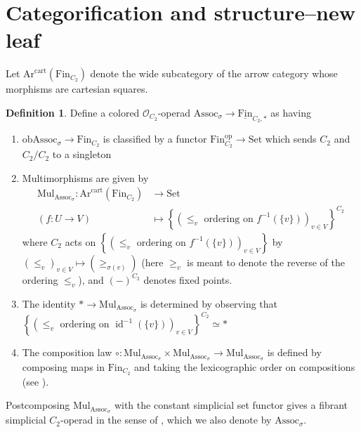 \documentclass{article}
\DeclareMathOperator{\id}{id} %
\newcommand{\op}{\mathrm{op}}
\newcommand{\Assoc}{\mathrm{Assoc}}
\newcommand{\Fin}{\mathrm{Fin}} %
\newcommand{\Ar}{\mathrm{Ar}}
\theoremstyle{definition}
\newtheorem{definition}[equation]{Definition}
\begin{document}
\section{Categorification and structure--new leaf}
Let $ \Ar^{\mathrm{cart}}\left(\Fin_{C_2}\right) $ denote the wide subcategory of the arrow category whose morphisms are cartesian squares. 
\begin{definition}%
    Define a colored $ \mathcal{O}_{C_2} $-operad $ \mathbf{\Assoc}_{\sigma} \to \underline{\mathrm{Fin}}_{C_2, *} $ as having 
    \begin{enumerate}[label=(\arabic*)]
        \item $ \mathrm{ob}\mathbf{\Assoc}_{\sigma} \to \mathrm{Fin}_{C_2} $ is classified by a functor $ \mathrm{Fin}_{C_2}^\op \to \mathrm{Set} $ which sends $ C_2 $ and $ C_2/C_2 $ to a singleton  
        \item Multimorphisms are given by 
        \begin{equation}
        \begin{split}
            \mathrm{Mul}_{\mathbf{\Assoc}_{\sigma}} \colon \Ar^{\mathrm{cart}}\left(\Fin_{C_2}\right) & \to \mathrm{Set} \\
            (f : U \to V) & \mapsto \left\{ \left( \leq_v \text{ ordering on }f^{-1}(\{v\})\right)_{v \in V}\right\}^{C_2}
        \end{split}
        \end{equation}
        where $ C_2 $ acts on $ \left\{ \left( \leq_v \text{ ordering on }f^{-1}(\{v\})\right)_{v \in V}\right\} $ by $ \left(\leq_v\right)_{v \in V} \mapsto \left(\geq_{\sigma(v)} \right) $ (here $ \geq_v $ is meant to denote the reverse of the ordering $ \leq_v $), and $ (-)^{C_2} $ denotes fixed points.  
        \item The identity $ \ast\to \mathrm{Mul}_{\mathbf{\Assoc}_{\sigma}} $ is determined by observing that $ \left\{ \left( \leq_v \text{ ordering on }\id^{-1}(\{v\})\right)_{v \in V}\right\}^{C_2} \simeq * $ 
        \item The composition law $ \circ : \mathrm{Mul}_{\mathbf{\Assoc}_{\sigma}} \times \mathrm{Mul}_{\mathbf{\Assoc}_{\sigma}} \to \mathrm{Mul}_{\mathbf{\Assoc}_{\sigma}} $ is defined by composing maps in $ \Fin_{C_2} $ and taking the lexicographic order on compositions (see \cite[Remark 4.1.1.4]{LurHA}).
    \end{enumerate}
    Postcomposing $ \mathrm{Mul}_{\mathbf{\Assoc}_{\sigma}} $ with the constant simplicial set functor gives a fibrant simplicial $ C_2 $-operad in the sense of \cite[Definition 2.5.4]{NS22}, which we also denote by $ \mathbf{\Assoc}_{\sigma} $. 
\end{definition}
\end{document}
